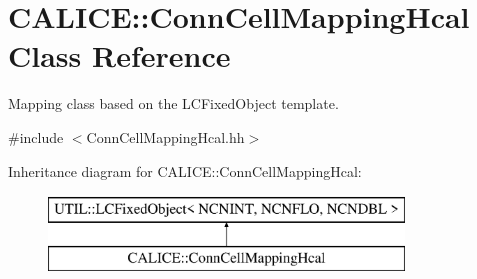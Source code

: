 \section{C\-A\-L\-I\-C\-E\-:\-:Conn\-Cell\-Mapping\-Hcal Class Reference}
\label{classCALICE_1_1ConnCellMappingHcal}


Mapping class based on the L\-C\-Fixed\-Object template.  




{\ttfamily \#include $<$Conn\-Cell\-Mapping\-Hcal.\-hh$>$}

Inheritance diagram for C\-A\-L\-I\-C\-E\-:\-:Conn\-Cell\-Mapping\-Hcal\-:\begin{figure}[H]
\begin{center}
\leavevmode
\includegraphics[height=2.000000cm]{classCALICE_1_1ConnCellMappingHcal}
\end{center}
\end{figure}

